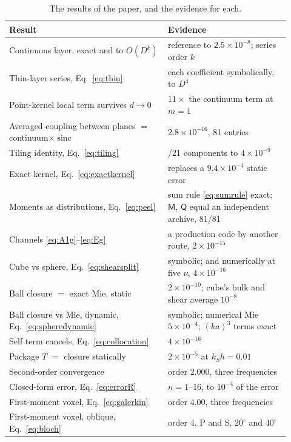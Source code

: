 \documentclass[preprint,review,12pt]{elsarticle}
\newcommand{\sinc}{\operatorname{sinc}}
\begin{document}
\begin{table}[htbp]
\centering
\caption{The results of the paper, and the evidence for each.}\label{tab:evidence}
\begin{tabular}{@{}>{\raggedright\arraybackslash}p{0.52\linewidth}>{\raggedright\arraybackslash}p{0.40\linewidth}@{}}
\toprule
Result & Evidence \\
\midrule
Continuous layer, exact and to $O(D^k)$ & reference to $2.5\times10^{-8}$; series order $k$ \\
Thin-layer series, Eq.~\eqref{eq:thin} & each coefficient symbolically, to $D^4$ \\
Point-kernel local term survives $d\to0$ & $11\times$ the continuum term at $m=1$ \\
Averaged coupling between planes $=$ continuum$\times\sinc$ & $2.8\times10^{-16}$, 81 entries \\
Tiling identity, Eq.~\eqref{eq:tiling} & 21/21 components to $4\times10^{-9}$ \\
Exact kernel, Eq.~\eqref{eq:exactkernel} & replaces a $9.4\times10^{-4}$ static error \\
Moments as distributions, Eq.~\eqref{eq:peel} & sum rule \eqref{eq:sumrule} exact; $\mathsf M$, $\mathsf Q$ equal an independent archive, 81/81 \\
Channels \eqref{eq:A1g}--\eqref{eq:Eg} & a production code by another route, $2\times10^{-15}$ \\
Cube vs sphere, Eq.~\eqref{eq:shearsplit} & symbolic; and numerically at five $\nu$, $4\times10^{-16}$ \\
Ball closure $=$ exact Mie, static & $2\times10^{-10}$; cube's bulk and shear average $10^{-8}$ \\
Ball closure vs Mie, dynamic, Eq.~\eqref{eq:spheredynamic} & symbolic; numerical Mie $5\times10^{-4}$;
$(ka)^3$ terms exact \\
Self term cancels, Eq.~\eqref{eq:collocation} & $4\times10^{-16}$ \\
Package $T$ $=$ closure statically & $2\times10^{-5}$ at $k_Sh=0.01$ \\
Second-order convergence & order $2.000$, three frequencies \\
Closed-form error, Eq.~\eqref{eq:errorR} & $n=1$--$16$, to $10^{-4}$ of the error \\
First-moment voxel, Eq.~\eqref{eq:galerkin} & order $4.00$, three frequencies \\
First-moment voxel, oblique, Eq.~\eqref{eq:bloch} & order $4$, P and S, $20^\circ$ and $40^\circ$ \\

\end{tabular}
\end{table}
\end{document}
